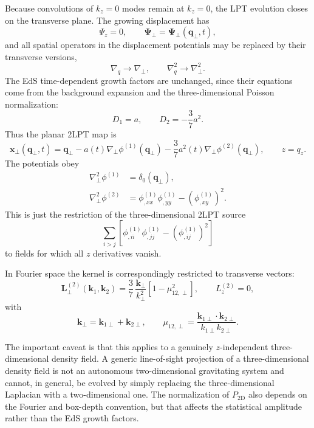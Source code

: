 \documentclass[11pt]{article}
\newcommand{\gradq}{\nabla_{\!q}}
\newcommand{\lapq}{\nabla_{\!q}^{2}}
\newcommand{\PsiL}{\bm{\Psi}}
\newcommand{\xv}{\bm{x}}
\newcommand{\qv}{\bm{q}}
\newcommand{\kv}{\bm{k}}
\newcommand{\kone}{\bm{k}_1}
\newcommand{\ktwo}{\bm{k}_2}
\begin{document}
Because convolutions of $k_z=0$ modes remain at $k_z=0$, the LPT evolution
closes on the transverse plane.  The growing displacement has
\begin{equation}
  \Psi_z=0,\qquad
  \PsiL_\perp=\PsiL_\perp(\qv_\perp,t),
\end{equation}
and all spatial operators in the displacement potentials may be replaced by
their transverse versions,
\begin{equation}
  \gradq \rightarrow \nabla_{\perp},
  \qquad
  \lapq \rightarrow \nabla_{\perp}^{2}.
\end{equation}
The EdS time-dependent growth factors are unchanged, since their equations
come from the background expansion and the three-dimensional Poisson
normalization:
\begin{equation}
  D_1=a,\qquad D_2=-\frac{3}{7}a^2 .
\end{equation}
Thus the planar 2LPT map is
\begin{equation}
  \boxed{
  \xv_\perp(\qv_\perp,t)
  =
  \qv_\perp
  -a(t)\nabla_{\perp}\phi^{(1)}(\qv_\perp)
  -\frac{3}{7}a^2(t)\nabla_{\perp}\phi^{(2)}(\qv_\perp),
  \qquad
  z=q_z .
  }
\end{equation}
The potentials obey
\begin{align}
  \nabla_{\perp}^{2}\phi^{(1)}
    &= \delta_0(\qv_\perp),\\
  \nabla_{\perp}^{2}\phi^{(2)}
    &=
    \phi^{(1)}_{,xx}\phi^{(1)}_{,yy}
    -
    \left(\phi^{(1)}_{,xy}\right)^2 .
\end{align}
This is just the restriction of the three-dimensional 2LPT source
\begin{equation}
  \sum_{i>j}
  \left[
    \phi^{(1)}_{,ii}\phi^{(1)}_{,jj}
    -\left(\phi^{(1)}_{,ij}\right)^2
  \right]
\end{equation}
to fields for which all $z$ derivatives vanish.

In Fourier space the kernel is correspondingly restricted to transverse
vectors:
\begin{equation}
  \bm{L}^{(2)}_\perp(\kone,\ktwo)
  =
  \frac{3}{7}\,
  \frac{\kv_\perp}{k_\perp^2}
  \left[1-\mu_{12,\perp}^2\right],
  \qquad
  L_z^{(2)}=0,
\end{equation}
with
\begin{equation}
  \kv_\perp=\bm{k}_{1\perp}+\bm{k}_{2\perp},
  \qquad
  \mu_{12,\perp}
  =
  \frac{\bm{k}_{1\perp}\cdot\bm{k}_{2\perp}}
       {k_{1\perp}k_{2\perp}}.
\end{equation}

The important caveat is that this applies to a genuinely $z$-independent
three-dimensional density field.  A generic line-of-sight projection of a
three-dimensional density field is not an autonomous two-dimensional
gravitating system and cannot, in general, be evolved by simply replacing the
three-dimensional Laplacian with a two-dimensional one.  The normalization of
$P_{\mathrm{2D}}$ also depends on the Fourier and box-depth convention, but
that affects the statistical amplitude rather than the EdS growth factors.
\end{document}
